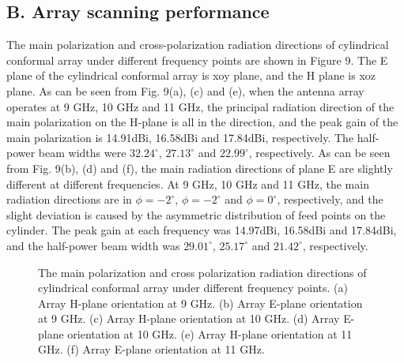 \documentclass[USenglish]{article}
\theoremstyle{dgthm}
\theoremstyle{dgdef}
\begin{document}
\subsection*{B.	Array scanning performance}
The main polarization and cross-polarization radiation directions of cylindrical conformal array under different frequency points are shown in Figure 9. The E plane of the cylindrical conformal array is xoy plane, and the H plane is xoz plane. As can be seen from Fig. 9(a), (c) and (e), when the antenna array operates at 9 GHz, 10 GHz and 11 GHz, the principal radiation direction of the main polarization on the H-plane is all in the direction, and the peak gain of the main polarization is 14.91dBi, 16.58dBi and 17.84dBi, respectively. The half-power beam widths were $32.24^\circ$, $27.13^\circ$ and $22.99^\circ$, respectively. As can be seen from Fig. 9(b), (d) and (f), the main radiation directions of plane E are slightly different at different frequencies. At 9 GHz, 10 GHz and 11 GHz, the main radiation directions are in $\phi=-2^\circ$, $\phi=-2^\circ$  and $\phi=0^\circ$, respectively, and the slight deviation is caused by the asymmetric distribution of feed points on the cylinder. The peak gain at each frequency was 14.97dBi, 16.58dBi and 17.84dBi, and the half-power beam width was $29.01^\circ$, $25.17^\circ$ and $21.42^\circ$, respectively.
\begin{figure}[htbp]
	\centering
	\caption{The main polarization and cross polarization radiation directions of cylindrical conformal array under different frequency points. (a) Array H-plane orientation at 9 GHz. (b) Array E-plane orientation at 9 GHz. (c) Array H-plane orientation at 10 GHz. (d) Array E-plane orientation at 10 GHz. (e) Array H-plane orientation at 11 GHz. (f) Array E-plane orientation at 11 GHz.}
\end{figure}
\end{document}
